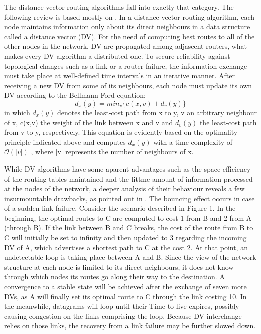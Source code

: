 \documentclass{acm_proc_article-sp}
\begin{document}
The distance-vector routing algorithms fall into exactly that category. The following review is based mostly on \cite{kurose}. In a distance-vector routing algorithm, each node maintains information only about its direct neighbours in a data structure called a distance vector (DV). For the need of computing best routes to all of the other nodes in the network, DV are propagated among adjascent routers, what makes every DV algorithm a distributed one. To secure reliability against topological changes such as a link or a router failure, the information exchange must take place at well-defined time intervals in an iterative manner. After receiving a new DV from some of its neighbours, each node must update its own DV according to the Bellmann-Ford equation: \begin{equation*} d_{x}(y) = min_{v}\{c(x,v)+d_{v}(y)\} \end{equation*} in which $d_{x}(y)$ denotes the least-cost path from x to y, v an arbitrary neighbour of x, c(x,v) the weight of the link between x and v and $d_{v}(y)$ the least-cost path from v to y, respectively. This equation is evidently based on the optimality principle indicated above and computes $d_{x}(y)$ with a time complexity of $\mathcal{O}(|v|)$ , where |v| represents the number of neighbours of x.

While DV algorithms have some aparent advantages such as the space efficiency of the routing tables maintained and the littme amount of information processed at the nodes of the network, a deeper analysis of their behaviour reveals a few insurmountable drawbacks, as pointed out in \cite{huitema}. The bouncing effect occurs in case of a sudden link failure. Consider the scenario described in Figure 1. In the beginning, the optimal routes to C are computed to cost 1 from B and 2 from A (through B). If the link between B and C breaks, the cost of the route from B to C will initially be set to infinity and then updated to 3 regarding the incoming DV of A, which advertises a shortest path to C at the cost 2. At that point, an undetectable loop is taking place between A and B. Since the view of the network structure at each node is limited to its direct neighbours, it does not know through which nodes its routes go along their way to the destination. A convergence to a stable state will be achieved after the exchange of seven more DVs, as A will finally set its optimal route to C through the link costing 10. In the meanwhile, datagrams will loop until their Time to live expires, possibly causing congestion on the links comprising the loop. Because DV interchange relies on those links, the recovery from a link failure may be further slowed down.
\end{document}
